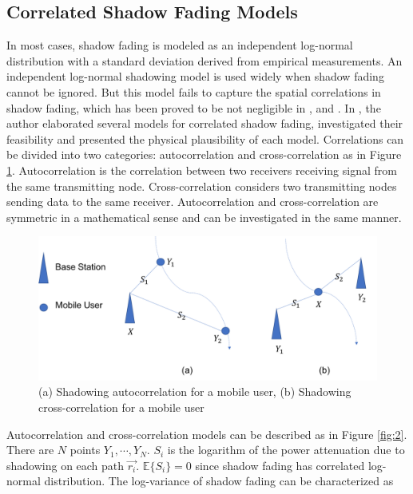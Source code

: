 \subsection{Correlated Shadow Fading Models}
\label{subsec:2}
\par In most cases, shadow fading is modeled as an independent log-normal distribution \cite{goldsmith2005wireless} with a standard deviation derived from empirical measurements. An independent log-normal shadowing model is used widely when shadow fading cannot be ignored. But this model fails to capture the spatial correlations in shadow fading, which has been proved to be not negligible in \cite{graziano1978propagation}, \cite{marsan1990shadowing} and \cite{liberti1992statistics}. In \cite{szyszkowicz2010feasibility}, the author elaborated several models for correlated shadow fading,  investigated their feasibility and presented the physical plausibility of each model. Correlations can be divided into two categories: autocorrelation and cross-correlation as in Figure \ref{fig:1}. Autocorrelation is the correlation between two receivers receiving signal from the same transmitting node. Cross-correlation considers two transmitting nodes sending data to the same receiver. Autocorrelation and cross-correlation are symmetric in a mathematical sense and can be investigated in the same manner.
\begin{figure} 
\centering
\includegraphics[width=14cm]{correlation.png}
\caption{(a) Shadowing autocorrelation for a mobile user, (b) Shadowing cross-correlation for a mobile user}
\label{fig:1}
\end{figure}
\par Autocorrelation and cross-correlation models can be described as in Figure \ref{fig:2}. There are $N$ points $Y_{1}, \cdots, Y_{N}$.  $S_{i}$ is the logarithm of the power attenuation due to shadowing on each path $\vec{r_{i}}$. $\mathbb{E}\{S_{i}\} = 0$ since shadow fading has correlated log-normal distribution. The log-variance of shadow fading can be characterized as 
